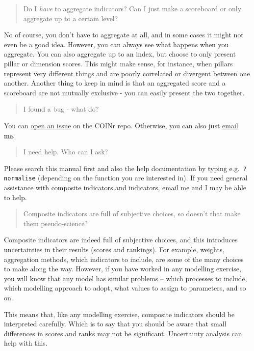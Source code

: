\documentclass[
]{book}
\begin{document}
\begin{quote}
Do I \emph{have} to aggregate indicators? Can I just make a scoreboard or only aggregate up to a certain level?
\end{quote}

No of course, you don't have to aggregate at all, and in some cases it might not even be a good idea. However, you can always see what happens when you aggregate. You can also aggregate up to an index, but choose to only present pillar or dimension scores. This might make sense, for instance, when pillars represent very different things and are poorly correlated or divergent between one another. Another thing to keep in mind is that an aggregated score and a scoreboard are not mutually exclusive - you can easily present the two together.

\begin{quote}
I found a bug - what do?
\end{quote}

You can \href{https://github.com/bluefoxr/COINr/issues}{open an issue} on the COINr repo. Otherwise, you can also just \href{mailto:william.becker@bluefoxdata.eu}{email me}.

\begin{quote}
I need help. Who can I ask?
\end{quote}

Please search this manual first and also the help documentation by typing e.g.~\texttt{?normalise} (depending on the function you are interested in). If you need general assistance with composite indicators and indicators, \href{mailto:william.becker@bluefoxdata.eu}{email me} and I may be able to help.

\begin{quote}
Composite indicators are full of subjective choices, so doesn't that make them pseudo-science?
\end{quote}

Composite indicators are indeed full of subjective choices, and this introduces uncertainties in their results (scores and rankings). For example, weights, aggregation methods, which indicators to include, are some of the many choices to make along the way. However, if you have worked in any modelling exercise, you will know that any model has similar problems -- which processes to include, which modelling approach to adopt, what values to assign to parameters, and so on.

This means that, like any modelling exercise, composite indicators should be interpreted carefully. Which is to say that you should be aware that small differences in scores and ranks may not be significant. Uncertainty analysis can help with this.
\end{document}
